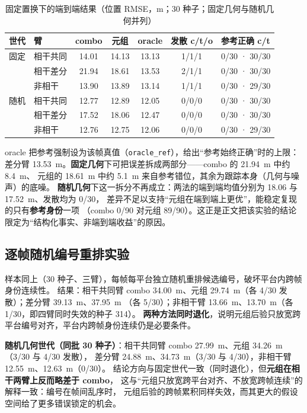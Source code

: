 \documentclass[UTF8,a4paper,zihao=-4]{ctexart}
\begin{document}
\begin{table}[htbp]\centering\small
\caption{固定置换下的端到端结果（位置 RMSE，m；30 种子；固定几何与随机几何并列）}\label{tab:sup-perm}
\begin{tabular}{@{}llccccl@{}}\toprule
世代 & 臂 & combo & 元组 & oracle & 发散 c/t/o & 参考正确 c/t \\ \midrule
固定 & 相干共同 & 14.01 & 14.13 & 13.13 & 1/1/1 & 0/30 · 30/30 \\
 & 相干差分 & 21.94 & 18.61 & 13.53 & 2/1/1 & 0/30 · 30/30 \\
 & 非相干 & 13.90 & 13.89 & 13.14 & 1/1/1 & 0/30 · 29/30 \\ \midrule
随机 & 相干共同 & 12.77 & 12.89 & 12.05 & 0/0/0 & 0/30 · 30/30 \\
 & 相干差分 & 17.52 & 18.06 & 12.47 & 0/0/0 & 0/30 · 30/30 \\
 & 非相干 & 12.76 & 12.75 & 12.06 & 0/0/0 & 0/30 · 29/30 \\ \bottomrule
\end{tabular}\end{table}

oracle 把参考强制设为该帧真值（\texttt{oracle\_ref}），给出“参考始终正确”时的上限：
差分臂 13.53~m。\textbf{固定几何}下可把误差拆成两部分——combo 的 21.94~m 中约 8.4~m、
元组的 18.61~m 中约 5.1~m 来自参考错位，其余为跟踪本身（几何与噪声）的底噪。
\textbf{随机几何}下这一拆分不再成立：两法的端到端均值分别为 18.06 与 17.52~m、发散均为 0/30，
差异不足以支持“元组在端到端上更优”，能稳定复现的只有\textbf{参考身份}一项
（combo 0/90 对元组 89/90）。这正是正文把该实验的结论限定为“结构化事实、非端到端收益”的原因。

\subsection{逐帧随机编号重排实验}\label{sup:reorder-audit}

样本同上（30 种子、三臂），每帧每平台独立随机重排候选编号，破坏平台内跨帧身份连续性。
结果：相干共同臂 combo 34.00~m、元组 29.74~m（各 4/30 发散）；差分臂 39.13~m、37.95~m
（各 5/30）；非相干臂 13.66~m、13.70~m（各 1/30，即四臂同时失效的种子 314）。
\textbf{两种方法同时退化}，说明元组后验只放宽跨平台编号对齐，平台内跨帧身份连续仍是必要条件。

\textbf{随机几何世代（同批 30 种子）}：相干共同臂 combo 27.99~m、元组 34.26~m（3/30 与 4/30 发散），
差分臂 24.88~m、34.73~m（3/30 与 4/30），非相干臂 12.55~m、12.63~m（0/30）。
结论方向与固定世代一致（同时退化），但\textbf{元组在相干两臂上反而略差于 combo}，
这与“元组只放宽跨平台对齐、不放宽跨帧连续”的解释一致：编号在帧间乱序时，
元组后验的跨帧累积同样失效，而其更大的假设空间给了更多错误锁定的机会。
\end{document}
